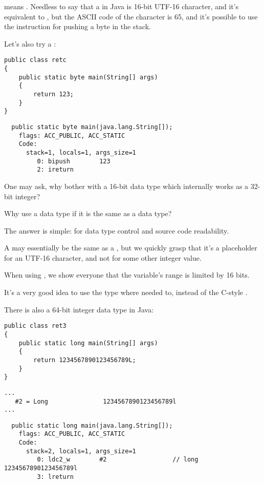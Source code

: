  means .
Needless to say that a  in Java is 16-bit UTF-16 character, 
and it's equivalent to , but the ASCII code of the  character is 65, and it's possible
to use the instruction for pushing a byte in the stack.

Let's also try a :

\begin{lstlisting}
public class retc
{
	public static byte main(String[] args) 
	{
		return 123;
	}
}
\end{lstlisting}

\begin{lstlisting}
  public static byte main(java.lang.String[]);
    flags: ACC_PUBLIC, ACC_STATIC
    Code:
      stack=1, locals=1, args_size=1
         0: bipush        123
         2: ireturn       
\end{lstlisting}

One may ask, why bother with a 16-bit  data type which internally works
as a 32-bit integer?

Why use a  data type if it is the same as a  data type?

The answer is simple: for data type control and source code readability.

A  may essentially be the same as a , but we quickly grasp that it's a placeholder for
an UTF-16 character, and not for some other integer value.

When using , we show everyone that the variable's range is limited by 16 bits.

It's a very good idea to use the  type where needed to, 
instead of the C-style .

There is also a 64-bit integer data type in Java:

\begin{lstlisting}
public class ret3
{
	public static long main(String[] args)
	{
		return 1234567890123456789L;
	}
}
\end{lstlisting}

\begin{lstlisting}[caption=Constant pool]
...
   #2 = Long               1234567890123456789l
...
\end{lstlisting}

\begin{lstlisting}
  public static long main(java.lang.String[]);
    flags: ACC_PUBLIC, ACC_STATIC
    Code:
      stack=2, locals=1, args_size=1
         0: ldc2_w        #2                  // long 1234567890123456789l
         3: lreturn       
\end{lstlisting}

